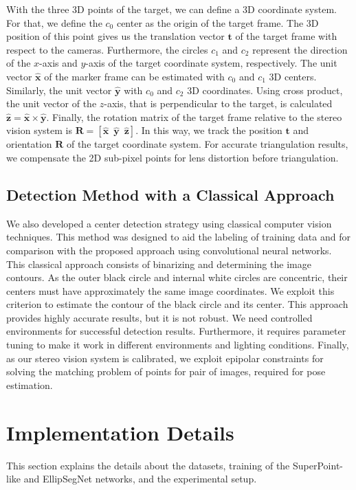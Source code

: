 \documentclass[final]{cvpr}
\begin{document}
With the three 3D points of the target, we can define a 3D coordinate system. For that, we define the $c_0$ center as the origin of the target frame. The 3D position of this point gives us the translation vector $\mathbf{t}$ of the target frame with respect to the cameras. Furthermore, the circles $c_1$ and $c_2$ represent the direction of the $x$-axis and $y$-axis of the target coordinate system, respectively. The unit vector $\hat{\mathbf{x}}$ of the marker frame can be estimated with $c_0$ and $c_1$ 3D centers. Similarly, the unit vector $\hat{\mathbf{y}}$ with $c_0$ and $c_2$ 3D coordinates. Using cross product, the unit vector of the $z$-axis, that is perpendicular to the target, is calculated $\hat{\mathbf{z}}=\hat{\mathbf{x}} \times \hat{\mathbf{y}}$. Finally, the rotation matrix of the target frame relative to the stereo vision system is $\mathbf{R} = [\hat{\mathbf{x}} \;\: \hat{\mathbf{y}} \;\: \hat{\mathbf{z}}]$. In this way, we track the position $\mathbf{t}$ and orientation $\mathbf{R}$ of the target coordinate system. For accurate triangulation results, we compensate the 2D sub-pixel points for lens distortion before triangulation.



\subsection{Detection Method with a Classical Approach}
\label{sec:classical_method}
We also developed a center detection strategy using classical computer vision techniques. This method was designed to aid the labeling of training data and for comparison with the proposed approach using convolutional neural networks. This classical approach consists of binarizing and determining the image contours. As the outer black circle and internal white circles are concentric, their centers must have approximately the same image coordinates. We exploit this criterion to estimate the contour of the black circle and its center. This approach provides highly accurate results, but it is not robust. We need controlled environments for successful detection results. Furthermore, it requires parameter tuning to make it work in different environments and lighting conditions. Finally, as our stereo vision system is calibrated, we exploit epipolar constraints for solving the matching problem of points for pair of images, required for pose estimation.




\section{Implementation Details}
This section explains the details about the datasets, training of the SuperPoint-like and EllipSegNet networks, and the experimental setup.
\end{document}

